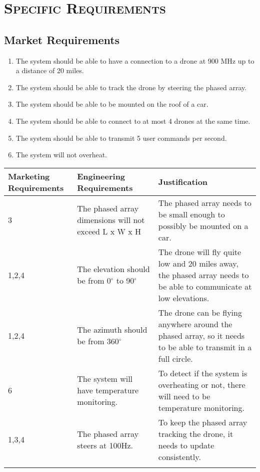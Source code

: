 \documentclass[ProjectRequirements.tex]{subfiles}
\begin{document}
\bigskip

\section{\textsc{\Large Specific Requirements}}
	\subsection{Market Requirements}
	\begin{enumerate}
		\item The system should be able to have a connection to a drone at 900 MHz up to a distance of 20 miles.
		\item The system should be able to track the drone by steering the phased array.
		\item The system should be able to be mounted on the roof of a car.
		\item The system should be able to connect to at most 4 drones at the same time.
		\item The system should be able to transmit 5 user commands per second.
		\item The system will not overheat.
	\end{enumerate}
	\begin{center}
	\begin{tabular}{| p{2.3cm} | p{5cm} | p{7cm} |} \hline
		Marketing Requirements & Engineering Requirements & Justification \\ \hline \hline
		3 & The phased array dimensions will not exceed L x W x H & The phased array needs to be small enough to possibly be mounted on a car. \\ \hline
		1,2,4 & The elevation should be from 0$^{\circ}$ to 90$^{\circ}$ & The drone will fly quite low and 20 miles away, the phased array needs to be able to communicate at low elevations.\\\hline
		1,2,4 & The azimuth should be from 360$^{\circ}$ & The drone can be flying anywhere around the phased array, so it needs to be able to transmit in a full circle. \\\hline
		6 & The system will have temperature monitoring. & To detect if the system is overheating or not, there will need to be temperature monitoring. \\\hline
		1,3,4  & The phased array steers at 100Hz. & To keep the phased array tracking the drone, it needs to update consistently. \\\hline
		 &  & \\\hline
	\end{tabular}
	\end{center}
\end{document}
